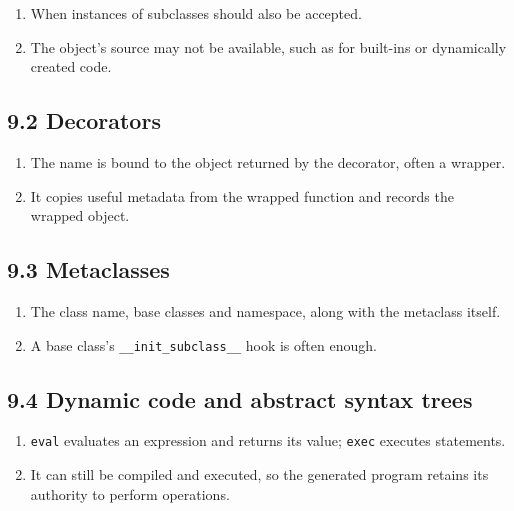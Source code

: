 \documentclass[11pt]{article}
\begin{document}
\begin{keepsection}
\begin{keepsection}
\begin{enumerate}
\item When instances of subclasses should also be accepted.
\item The object’s source may not be available, such as for built-ins or dynamically created code.
\end{enumerate}

\end{keepsection}
\begin{keepsection}\subsection{9.2 Decorators}

\begin{enumerate}
\item The name is bound to the object returned by the decorator, often a wrapper.
\item It copies useful metadata from the wrapped function and records the wrapped object.
\end{enumerate}

\end{keepsection}
\begin{keepsection}\subsection{9.3 Metaclasses}

\begin{enumerate}
\item The class name, base classes and namespace, along with the metaclass itself.
\item A base class’s \texttt{\_\_init\_subclass\_\_} hook is often enough.
\end{enumerate}

\end{keepsection}
\begin{keepsection}\subsection{9.4 Dynamic code and abstract syntax trees}

\begin{enumerate}
\item \texttt{eval} evaluates an expression and returns its value; \texttt{exec} executes statements.
\item It can still be compiled and executed, so the generated program retains its authority to perform operations.
\end{enumerate}


\end{keepsection}
\end{keepsection}
\end{document}
